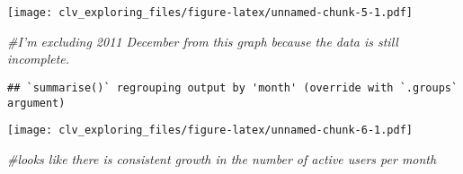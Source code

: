 \documentclass[]{article}
\newenvironment{Shaded}{\begin{snugshade}}{\end{snugshade}}
\newcommand{\CommentTok}[1]{\textcolor[rgb]{0.56,0.35,0.01}{\textit{#1}}}
\newcommand{\DataTypeTok}[1]{\textcolor[rgb]{0.13,0.29,0.53}{#1}}
\newcommand{\KeywordTok}[1]{\textcolor[rgb]{0.13,0.29,0.53}{\textbf{#1}}}
\newcommand{\NormalTok}[1]{#1}
\newcommand{\OperatorTok}[1]{\textcolor[rgb]{0.81,0.36,0.00}{\textbf{#1}}}
\newcommand{\StringTok}[1]{\textcolor[rgb]{0.31,0.60,0.02}{#1}}
\begin{document}
\texttt{[image: clv\_exploring\_files/figure-latex/unnamed-chunk-5-1.pdf]}

\begin{Shaded}
\begin{Highlighting}[]
\CommentTok{#I'm excluding 2011 December from this graph because the data is still incomplete.}
\end{Highlighting}
\end{Shaded}

\begin{Shaded}
\end{Shaded}

\begin{verbatim}
## `summarise()` regrouping output by 'month' (override with `.groups` argument)
\end{verbatim}

\texttt{[image: clv\_exploring\_files/figure-latex/unnamed-chunk-6-1.pdf]}

\begin{Shaded}
\begin{Highlighting}[]
\CommentTok{#looks like there is consistent growth in the number of active users per month}
\end{Highlighting}
\end{Shaded}
\end{document}
